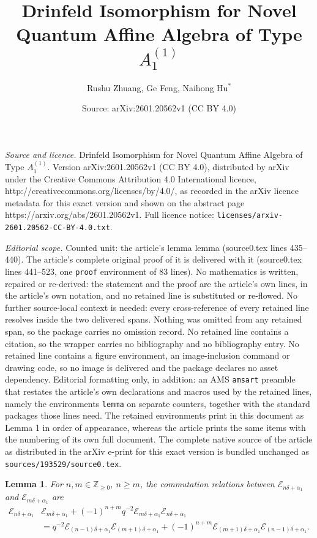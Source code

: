 \documentclass[10pt,a4paper]{amsart}
\title{Drinfeld Isomorphism for Novel Quantum Affine Algebra of Type \(A_{1}^{(1)}\)}
\author{Rushu Zhuang, Ge Feng, Naihong Hu$^*$}
\date{Source: arXiv:2601.20562v1 (CC BY 4.0)}
\newtheorem{lemma}{Lemma}
\begin{document}
\maketitle

\noindent\emph{Source and licence.} Drinfeld Isomorphism for Novel Quantum Affine Algebra of Type \(A_{1}^{(1)}\). Version arXiv:2601.20562v1 (CC BY 4.0), distributed by arXiv under the Creative Commons Attribution 4.0 International licence, http://creativecommons.org/licenses/by/4.0/, as recorded in the arXiv licence metadata for this exact version and shown on the abstract page https://arxiv.org/abs/2601.20562v1. Full licence notice: \texttt{licenses/arxiv-2601.20562-CC-BY-4.0.txt}.\par\smallskip

\noindent\textit{Editorial scope.} Counted unit: the article's lemma lemma (source0.tex lines 435--440). The article's complete original proof of it is delivered with it (source0.tex lines 441--523, one \texttt{proof} environment of 83 lines). No mathematics is written, repaired or re-derived: the statement and the proof are the article's own lines, in the article's own notation, and no retained line is substituted or re-flowed.  No further source-local context is needed: every cross-reference of every retained line resolves inside the two delivered spans.  Nothing was omitted from any retained span, so the package carries no omission record.  No retained line contains a citation, so the wrapper carries no bibliography and no bibliography entry.  No retained line contains a figure environment, an image-inclusion command or drawing code, so no image is delivered and the package declares no asset dependency.  Editorial formatting only, in addition: an AMS \texttt{amsart} preamble that restates the article's own declarations and macros used by the retained lines, namely the environments \texttt{lemma} on separate counters, together with the standard packages those lines need.  The retained environments print in this document as Lemma 1 in order of appearance, whereas the article prints the same items with the numbering of its own full document.  The complete native source of the article as distributed in the arXiv e-print for this exact version is bundled unchanged as \texttt{sources/193529/source0.tex}.
\begin{lemma}
For \(n,m\in\mathbb{Z}_{\ge 0}\), \(n\ge m\), the commutation relations between \(\mathcal{E}_{n\delta+\alpha_{1}}\) and \(\mathcal{E}_{m\delta+\alpha_{1}}\) are 
\begin{align*}     
\mathcal{E}_{n\delta+\alpha_{1}}&\mathcal{E}_{m\delta+\alpha_{1}}+(-1)^{n+m}q^{-2}\mathcal{E}_{m\delta+\alpha_{1}}\mathcal{E}_{n\delta+\alpha_{1}}\\ &=q^{-2}\mathcal{E}_{(n-1)\delta+\alpha_{1}}\mathcal{E}_{(m+1)\delta+\alpha_{1}}+(-1)^{n+m}\mathcal{E}_{(m+1)\delta+\alpha_{1}}\mathcal{E}_{(n-1)\delta+\alpha_{1}}.  
\end{align*}  
\end{lemma} 
\end{document}
